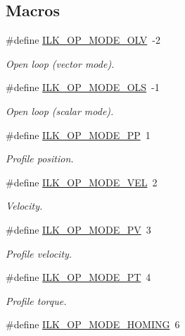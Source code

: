 \subsection*{Macros}
\begin{DoxyCompactItemize}
\item 
\#define \hyperlink{group__IL__CONST__OP__MODE_ga1f22e168e8a3092acf6982d6374ef829}{I\+L\+K\+\_\+\+O\+P\+\_\+\+M\+O\+D\+E\+\_\+\+O\+LV}~-\/2
\begin{DoxyCompactList}\small\item\em Open loop (vector mode). \end{DoxyCompactList}\item 
\#define \hyperlink{group__IL__CONST__OP__MODE_ga0a7de45bb24cb05b8bae5a4399baef6e}{I\+L\+K\+\_\+\+O\+P\+\_\+\+M\+O\+D\+E\+\_\+\+O\+LS}~-\/1
\begin{DoxyCompactList}\small\item\em Open loop (scalar mode). \end{DoxyCompactList}\item 
\#define \hyperlink{group__IL__CONST__OP__MODE_ga52b02647597ea4e09718a62b2ee8d994}{I\+L\+K\+\_\+\+O\+P\+\_\+\+M\+O\+D\+E\+\_\+\+PP}~1
\begin{DoxyCompactList}\small\item\em Profile position. \end{DoxyCompactList}\item 
\#define \hyperlink{group__IL__CONST__OP__MODE_ga2e2b186a23f0b7d57a0f9faa590cea05}{I\+L\+K\+\_\+\+O\+P\+\_\+\+M\+O\+D\+E\+\_\+\+V\+EL}~2
\begin{DoxyCompactList}\small\item\em Velocity. \end{DoxyCompactList}\item 
\#define \hyperlink{group__IL__CONST__OP__MODE_ga835525c916eb87bd07495702423f5571}{I\+L\+K\+\_\+\+O\+P\+\_\+\+M\+O\+D\+E\+\_\+\+PV}~3
\begin{DoxyCompactList}\small\item\em Profile velocity. \end{DoxyCompactList}\item 
\#define \hyperlink{group__IL__CONST__OP__MODE_ga620365ff1869f00172b03ed1f8ea3b2f}{I\+L\+K\+\_\+\+O\+P\+\_\+\+M\+O\+D\+E\+\_\+\+PT}~4
\begin{DoxyCompactList}\small\item\em Profile torque. \end{DoxyCompactList}\item 
\#define \hyperlink{group__IL__CONST__OP__MODE_ga9f1663d81dc7e4cb79afa5cdfceded54}{I\+L\+K\+\_\+\+O\+P\+\_\+\+M\+O\+D\+E\+\_\+\+H\+O\+M\+I\+NG}~6

\end{DoxyCompactItemize}
